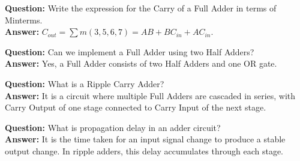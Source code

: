 \begin{vivaqa}
\textbf{Question:} Write the expression for the Carry of a Full Adder in terms of Minterms.\\[4pt]
\textbf{Answer:} $C_{out} = \sum m(3, 5, 6, 7) = AB + BC_{in} + AC_{in}$.
\end{vivaqa}

\begin{vivaqa}
\textbf{Question:} Can we implement a Full Adder using two Half Adders?\\[4pt]
\textbf{Answer:} Yes, a Full Adder consists of two Half Adders and one OR gate.
\end{vivaqa}

\begin{vivaqa}
\textbf{Question:} What is a Ripple Carry Adder?\\[4pt]
\textbf{Answer:} It is a circuit where multiple Full Adders are cascaded in series, with Carry Output of one stage connected to Carry Input of the next stage.
\end{vivaqa}

\begin{vivaqa}
\textbf{Question:} What is propagation delay in an adder circuit?\\[4pt]
\textbf{Answer:} It is the time taken for an input signal change to produce a stable output change. In ripple adders, this delay accumulates through each stage.
\end{vivaqa}
